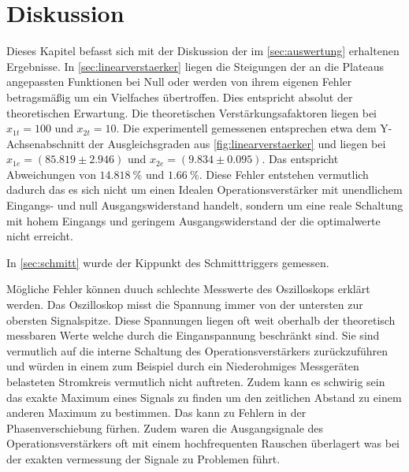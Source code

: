 

\section{Diskussion}
\label{sec:Diskussion}

Dieses Kapitel befasst sich mit der Diskussion der im \autoref{sec:auswertung} erhaltenen Ergebnisse.
In \autoref{sec:linearverstaerker} liegen die Steigungen der an die Plateaus angepassten Funktionen
bei Null oder werden von ihrem eigenen Fehler betragsmäßig um ein Vielfaches übertroffen. Dies entspricht
absolut der theoretischen Erwartung. Die theoretischen Verstärkungsafaktoren liegen bei $x_{1t}=100$ und
$x_{2t}=10$. Die experimentell gemessenen entsprechen etwa dem Y-Achsenabschnitt der Ausgleichsgraden aus
\autoref{fig:linearverstaerker} und liegen bei $x_{1e}=(85.819\pm 2.946)$ und $x_{2e}=(9.834 \pm 0.095)$.
Das entspricht Abweichungen von $\SI[]{14.818}[]{\%}$ und $\SI[]{1.66}[]{\%}$. Diese Fehler entstehen vermutlich
dadurch das es sich nicht um einen Idealen Operationsverstärker mit unendlichem Eingangs- und null 
Ausgangswiderstand handelt, sondern um eine reale Schaltung mit hohem Eingangs und geringem Ausgangswiderstand
der die optimalwerte nicht erreicht.

In \autoref{sec:schmitt} wurde der Kippunkt des Schmitttriggers gemessen.





Mögliche Fehler können duuch schlechte Messwerte des Oszilloskops erklärt werden. Das Oszilloskop misst 
die Spannung immer von der untersten zur obersten Signalspitze. Diese Spannungen liegen oft weit oberhalb 
der theoretisch messbaren Werte welche durch die Einganspannung beschränkt sind. Sie sind vermutlich auf 
die interne Schaltung des Operationsverstärkers zurückzuführen und würden in einem zum Beispiel
durch ein Niederohmiges Messgeräten belasteten Stromkreis vermutlich nicht auftreten. Zudem kann es schwirig
sein das exakte Maximum eines Signals zu finden um den zeitlichen Abstand zu einem anderen Maximum zu bestimmen.
Das kann zu Fehlern in der Phasenverschiebung fürhen. Zudem waren die Ausgangsignale des Operationsverstärkers
oft mit einem hochfrequenten Rauschen überlagert was bei der exakten vermessung der Signale zu Problemen führt.
























